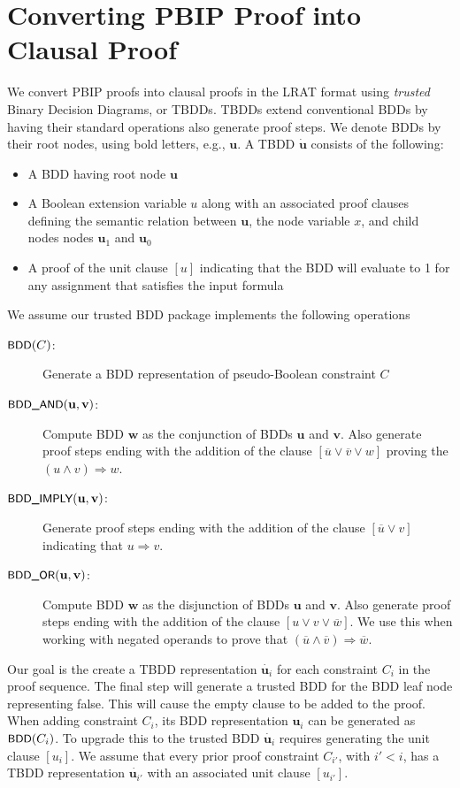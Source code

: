 \documentclass{easychair}
\renewcommand{\obar}[1]{\overline{#1}}
\newcommand{\trust}[1]{\dot {#1}}
\newcommand{\imply}{\Rightarrow}
\newcommand{\fname}[1]{\mbox{\small\sf #1}}
\newcommand{\node}[1]{\mathbf{#1}}
\newcommand{\nodeu}{\node{u}}
\newcommand{\nodev}{\node{v}}
\newcommand{\nodew}{\node{w}}
\begin{document}
\section{Converting PBIP Proof into Clausal Proof}

We convert PBIP proofs into clausal proofs in the LRAT format using
{\em trusted} Binary Decision Diagrams, or TBDDs.  TBDDs extend
conventional BDDs by having their standard operations also generate proof steps.
We denote BDDs by their root nodes, using bold letters, e.g., $\nodeu$.
A TBDD $\trust{\nodeu}$ consists of the following:
\begin{itemize}
\item A BDD having root node $\nodeu$
\item A Boolean extension variable $u$ along with an associated
  proof clauses defining the semantic relation between $\nodeu$,  the node variable $x$, and 
  child nodes
  nodes $\nodeu_1$ and $\nodeu_0$
\item A proof of the unit clause $[u]$ indicating that the BDD will evaluate to 1 for any assignment that satisfies the input formula
\end{itemize}

We assume our trusted BDD package implements the following operations
\begin{description}
\item[$\fname{BDD}(C)$:] Generate a BDD representation of pseudo-Boolean constraint $C$
\item[$\fname{BDD\_AND}(\nodeu, \nodev)$:] Compute BDD $\nodew$ as the conjunction of BDDs $\nodeu$ and $\nodev$.  Also generate proof steps ending with the addition of the clause $[\obar{u} \lor \obar{v} \lor w]$ proving the $(u \land v) \imply w$.
\item[$\fname{BDD\_IMPLY}(\nodeu, \nodev)$:]
  Generate proof steps ending with the addition of the clause $[\obar{u} \lor v]$ indicating that $u \imply v$.
\item[$\fname{BDD\_OR}(\nodeu, \nodev)$:] Compute BDD $\nodew$ as the disjunction of BDDs $\nodeu$ and $\nodev$.  Also generate proof steps ending with the addition of the clause $[u \lor v \lor \obar{w}]$.  We use this when working with negated operands to prove that
$(\obar{u} \land \obar{v}) \imply \obar{w}$.
  
\end{description}

Our goal is the create a TBDD representation $\trust{\nodeu_i}$ for
each constraint $C_i$ in the proof sequence.  The final step will
generate a trusted BDD for the BDD leaf node representing false.  This
will cause the empty clause to be added to the proof.
When adding constraint $C_i$, its BDD
representation $\nodeu_i$ can be generated as $\fname{BDD}(C_i)$.  To upgrade
this to the trusted BDD $\trust{\nodeu_i}$ requires generating the unit clause $[u_i]$.
We assume that every prior proof constraint $C_{i'}$, with $i' < i$, has a TBDD representation $\trust{\nodeu_{i'}}$ with an associated unit clause
$[u_{i'}]$.
\end{document}
